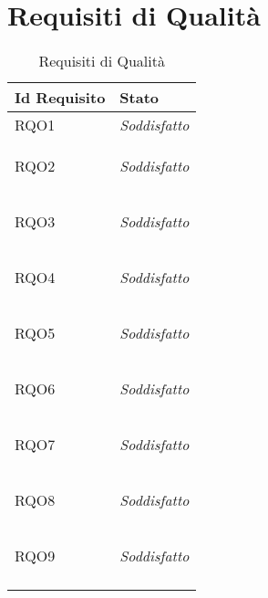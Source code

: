 \section{Requisiti di Qualità}
\normalsize
\begin{longtable}{|>{\centering}m{5cm}|m{5cm}<{\centering}|}
    \hline
    \textbf{Id Requisito} & \textbf{Stato}\\
    \hline
    \endhead
    \hypertarget{RQO1}{RQO1} & \textit{Soddisfatto}\\ \hline
   
    \hypertarget{RQO2}{RQO2} & \textit{Soddisfatto}\\ \hline
   
    \hypertarget{RQO3}{RQO3} & \textit{Soddisfatto}\\ \hline
   
    \hypertarget{RQO4}{RQO4} & \textit{Soddisfatto}\\ \hline
   
    \hypertarget{RQO5}{RQO5} & \textit{Soddisfatto}\\ \hline
   
    \hypertarget{RQO6}{RQO6} & \textit{Soddisfatto}\\ \hline
   
    \hypertarget{RQO7}{RQO7} & \textit{Soddisfatto}\\ \hline
   
    \hypertarget{RQO8}{RQO8} & \textit{Soddisfatto}\\ \hline
   
    \hypertarget{RQO9}{RQO9} & \textit{Soddisfatto}\\ \hline
   
    \caption[Requisiti di Qualità]{Requisiti di Qualità}
    \label{tabella:req2}
\end{longtable}
\clearpage
